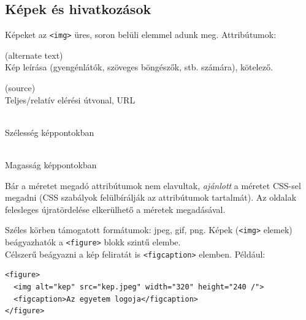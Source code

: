 \subsection{Képek és hivatkozások}

\begin{frame}
  Képeket az \texttt{<img>} üres, soron belüli elemmel adunk meg. Attribútumok:
  \begin{description}[m]
    \item[\texttt{alt}] (alternate text) \hfill \\ Kép leírása (gyengénlátók, szöveges böngészők, stb. számára), kötelező.
    \item[\texttt{src}] (source) \hfill \\ Teljes/relatív elérési útvonal, URL
    \item[\texttt{width}] \hfill \\ Szélesség képpontokban
    \item[\texttt{height}] \hfill \\ Magasság képpontokban
  \end{description}
  Bár a méretet megadó attribútumok nem elavultak, \emph{ajánlott} a méretet CSS-sel megadni (CSS szabályok felülbírálják az attribútumok tartalmát). Az oldalak felesleges újratördelése elkerülhető a méretek megadásával.
\end{frame}

\begin{frame}[fragile]
  Széles körben támogatott formátumok: jpeg, gif, png.
  \vfill
  Képek (\texttt{<img>} elemek) beágyazhatók a \texttt{<figure>} blokk szintű elembe.\\
  Célszerű beágyazni a kép feliratát is \texttt{<figcaption>} elemben.
  \vfill
  Például:
  \begin{verbatim}
<figure>
  <img alt="kep" src="kep.jpeg" width="320" height="240 /">
  <figcaption>Az egyetem logoja</figcaption>
</figure>
  \end{verbatim}
\end{frame}

